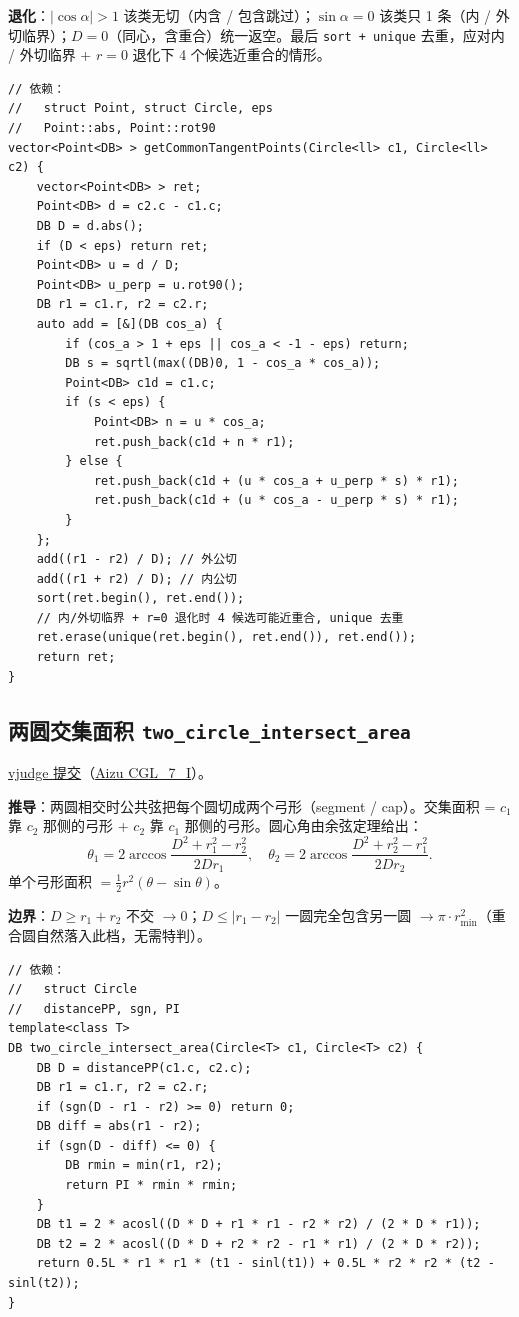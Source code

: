 		\textbf{退化}：$|\cos \alpha| > 1$ 该类无切（内含 / 包含跳过）；$\sin \alpha = 0$ 该类只 1 条（内 / 外切临界）；$D = 0$（同心，含重合）统一返空。最后 \texttt{sort + unique} 去重，应对内 / 外切临界 + $r = 0$ 退化下 4 个候选近重合的情形。

		\begin{verbatim}
// 依赖：
//   struct Point, struct Circle, eps
//   Point::abs, Point::rot90
vector<Point<DB> > getCommonTangentPoints(Circle<ll> c1, Circle<ll> c2) {
	vector<Point<DB> > ret;
	Point<DB> d = c2.c - c1.c;
	DB D = d.abs();
	if (D < eps) return ret;
	Point<DB> u = d / D;
	Point<DB> u_perp = u.rot90();
	DB r1 = c1.r, r2 = c2.r;
	auto add = [&](DB cos_a) {
		if (cos_a > 1 + eps || cos_a < -1 - eps) return;
		DB s = sqrtl(max((DB)0, 1 - cos_a * cos_a));
		Point<DB> c1d = c1.c;
		if (s < eps) {
			Point<DB> n = u * cos_a;
			ret.push_back(c1d + n * r1);
		} else {
			ret.push_back(c1d + (u * cos_a + u_perp * s) * r1);
			ret.push_back(c1d + (u * cos_a - u_perp * s) * r1);
		}
	};
	add((r1 - r2) / D); // 外公切
	add((r1 + r2) / D); // 内公切
	sort(ret.begin(), ret.end());
	// 内/外切临界 + r=0 退化时 4 候选可能近重合, unique 去重
	ret.erase(unique(ret.begin(), ret.end()), ret.end());
	return ret;
}
		\end{verbatim}

		\subsection{两圆交集面积 \texttt{two\_circle\_intersect\_area}}

		\href{https://vjudge.net/solution/69929585}{vjudge 提交}（\href{https://vjudge.net/problem/Aizu-CGL_7_I}{Aizu CGL\_7\_I}）。

		\textbf{推导}：两圆相交时公共弦把每个圆切成两个弓形（segment / cap）。交集面积 = $c_1$ 靠 $c_2$ 那侧的弓形 + $c_2$ 靠 $c_1$ 那侧的弓形。圆心角由余弦定理给出：
		$$\theta_1 = 2 \arccos \frac{D^2 + r_1^2 - r_2^2}{2 D r_1}, \quad \theta_2 = 2 \arccos \frac{D^2 + r_2^2 - r_1^2}{2 D r_2}.$$
		单个弓形面积 $= \tfrac{1}{2} r^2 (\theta - \sin \theta)$。

		\textbf{边界}：$D \ge r_1 + r_2$ 不交 $\to 0$；$D \le |r_1 - r_2|$ 一圆完全包含另一圆 $\to \pi \cdot r_{\min}^2$（重合圆自然落入此档，无需特判）。

		\begin{verbatim}
// 依赖：
//   struct Circle
//   distancePP, sgn, PI
template<class T>
DB two_circle_intersect_area(Circle<T> c1, Circle<T> c2) {
	DB D = distancePP(c1.c, c2.c);
	DB r1 = c1.r, r2 = c2.r;
	if (sgn(D - r1 - r2) >= 0) return 0;
	DB diff = abs(r1 - r2);
	if (sgn(D - diff) <= 0) {
		DB rmin = min(r1, r2);
		return PI * rmin * rmin;
	}
	DB t1 = 2 * acosl((D * D + r1 * r1 - r2 * r2) / (2 * D * r1));
	DB t2 = 2 * acosl((D * D + r2 * r2 - r1 * r1) / (2 * D * r2));
	return 0.5L * r1 * r1 * (t1 - sinl(t1)) + 0.5L * r2 * r2 * (t2 - sinl(t2));
}
		\end{verbatim}


